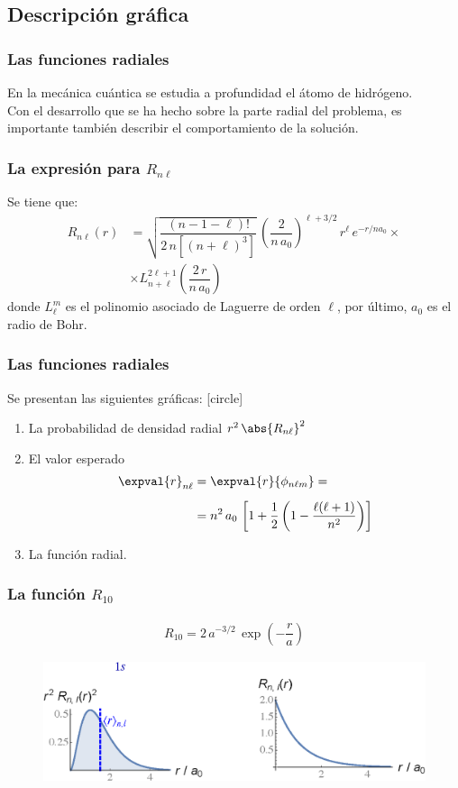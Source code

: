\subsection{Descripción gráfica}
\begin{frame}
\frametitle{Las funciones radiales}
En la mecánica cuántica se estudia a profundidad el átomo de hidrógeno.
\\
\bigskip
\pause
Con el desarrollo que se ha hecho sobre la parte radial del problema, es importante también describir el comportamiento de la solución.
\end{frame}
\begin{frame}
\frametitle{La expresión para $R_{n \ell}$}
Se tiene que:
\begin{align*}
R_{n \ell} (r) &= \sqrt{\dfrac{(n - 1 -\ell)!}{2 \, n [(n + \ell)^{3}]}} \, \left( \dfrac{2}{n \, a_{0}} \right)^{\ell+3/2} \, r^{\ell} \, e^{-r/n a_{0}} \times \\[0.5em]
&\times L_{n+\ell}^{2 \ell+1} \left( \dfrac{2 \, r}{n \, a_{0}} \right)
\end{align*}
donde $L_{\ell}^{m}$ es el polinomio asociado de Laguerre de orden $\ell$, por último, $a_{0}$ es el radio de Bohr.
\end{frame}
\begin{frame}
\frametitle{Las funciones radiales}
Se presentan las siguientes gráficas:
[circle]
\begin{enumerate}[<+->]
\item La probabilidad de densidad radial $r^{2} \, \abs{R_{n \ell}}^{2}$
\item El valor esperado
\begin{align*}
\expval{r}_{n \ell} &= \expval{r}{\phi_{n \ell m}} = \\[0.5em]
&= n^{2} \, a_{0} \, \left[ 1 + \dfrac{1}{2} \left( 1 - \dfrac{\ell (\ell + 1)}{n^{2}} \right) \right]
\end{align*}
\item La función radial.
\end{enumerate}
\end{frame}
\begin{frame}
\frametitle{La función $R_{10}$}
\begin{align*}
R_{10} = 2 \, a^{-3/2} \, \exp(-\dfrac{r}{a})
\end{align*}
\pause
\vspace*{-0.5cm}
\begin{figure}
   \centering
   \includegraphics[scale=0.67]{Imagenes/Plot_Funcion_Radial_10.eps}
\end{figure}
\end{frame}
